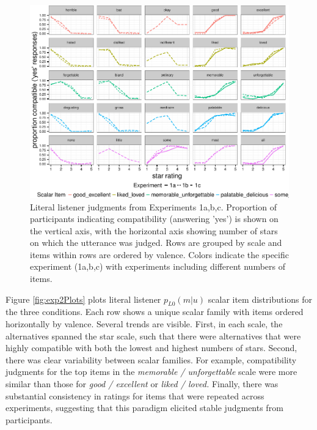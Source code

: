 \documentclass[10pt, letterpaper]{article}
\newenvironment{CodeChunk}{}{}
\begin{document}
\begin{CodeChunk}
\begin{figure}[t]

{\centering \includegraphics{figs/exp1Plots-1} 

}

\caption[Literal listener judgments from Experiments 1a,b,c]{Literal listener judgments from Experiments 1a,b,c. Proportion of participants indicating compatibility (answering 'yes') is shown on the vertical axis, with the horizontal axis showing number of stars on which the utterance was judged. Rows are grouped by scale and items within rows are ordered by valence. Colors indicate the specific experiment (1a,b,c) with experiments including different numbers of items.}\label{fig:exp1Plots}
\end{figure}
\end{CodeChunk}

Figure \ref{fig:exp2Plots} plots literal listener \(p_{L0}(m|u)\) scalar
item distributions for the three conditions. Each row shows a unique
scalar family with items ordered horizontally by valence. Several trends
are visible. First, in each scale, the alternatives spanned the star
scale, such that there were alternatives that were highly compatible
with both the lowest and highest numbers of stars. Second, there was
clear variability between scalar families. For example, compatibility
judgments for the top items in the \emph{memorable / unforgettable}
scale were more similar than those for \emph{good / excellent} or
\emph{liked / loved.} Finally, there was substantial consistency in
ratings for items that were repeated across experiments, suggesting that
this paradigm elicited stable judgments from participants.
\end{document}
